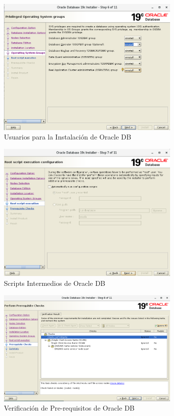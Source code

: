 \documentclass{article}
\begin{document}
\begin{figure}[H]
		\begin{center}
			\includegraphics[width=0.80\textwidth]{db_install_6_privileged_operating_system_groups.png}
		\end{center}
		\caption{Usuarios para la Instalación de Oracle DB}
\end{figure}


\begin{figure}[H]
		\begin{center}
			\includegraphics[width=0.80\textwidth]{db_install_7_root_script_execution.png}
		\end{center}
		\caption{Scripts Intermedios de Oracle DB}
\end{figure}


\begin{figure}[H]
		\begin{center}
			\includegraphics[width=0.80\textwidth]{db_install_8_pre_requisite_check.png}
		\end{center}
		\caption{Verificación de Pre-requisitos de Oracle DB}
\end{figure}
\end{document}
